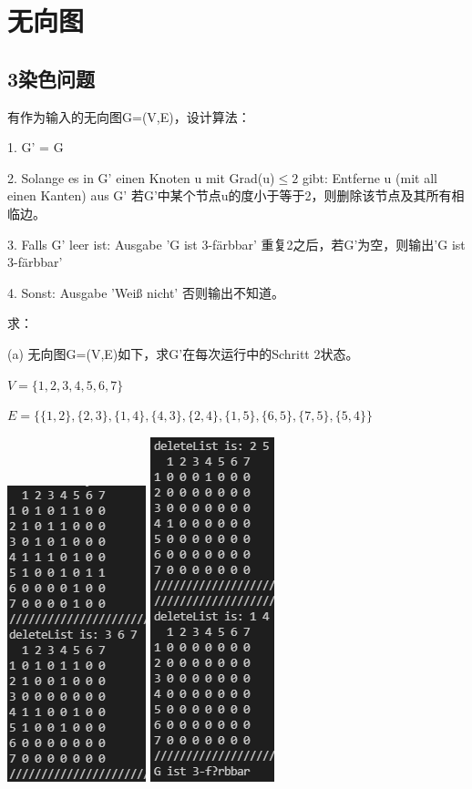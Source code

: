 \documentclass[a4paper]{article}    %
\begin{document}
\section{无向图}

\subsection{3染色问题} 有作为输入的无向图G=(V,E)，设计算法：

1. G' = G

2. Solange es in G' einen Knoten u mit Grad(u)$\leq 2$ gibt: Entferne u (mit all einen Kanten) aus G'
若G'中某个节点u的度小于等于2，则删除该节点及其所有相临边。

3. Falls G' leer ist: Ausgabe 'G ist 3-färbbar'
重复2之后，若G'为空，则输出'G ist 3-färbbar'

4. Sonst: Ausgabe 'Weiß nicht'
否则输出不知道。

\noindent 求：

(a) 无向图G=(V,E)如下，求G'在每次运行中的Schritt 2状态。

\indent\indent $V=\{1,2,3,4,5,6,7\}$

\indent\indent $E=\{\{1,2\},\{2,3\},\{1,4\},\{4,3\},\{2,4\},\{1,5\},\{6,5\},\{7,5\},\{5,4\}\}$

\begin{center}
    \includegraphics[scale=0.6]{8.png}
    \includegraphics[scale=0.6]{9.png}
\end{center}
\end{document}
